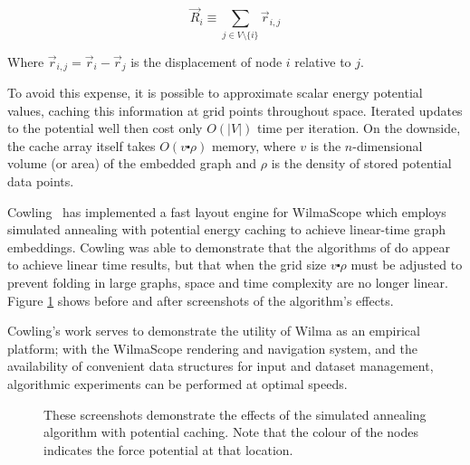 \documentclass[runningheads]{cl2emult}
\begin{document}
\begin{equation}
\label{repulsion}
\vec{R}_i \equiv \sum_{j \in V \setminus \{i\}} \vec{r}_{i,j}
\end{equation}

\noindent Where $\vec{r}_{i,j} = \vec{r}_i - \vec{r}_j$ is the displacement
of node $i$ relative to $j$.

To avoid this expense, it is possible to approximate scalar energy potential
values, caching this information at grid points throughout space.  Iterated
updates to the potential well then cost only $O(|V|)$ time per iteration.  On
the downside, the cache array itself takes $O(v \centerdot \rho)$ memory,
where $v$ is the $n$-dimensional volume (or area) of the embedded graph and
$\rho$ is the density of stored potential data points.

Cowling~\cite{cowling02fast} has implemented a fast layout engine for
WilmaScope which employs simulated annealing with potential energy caching to
achieve linear-time graph embeddings.  Cowling was able to demonstrate that
the algorithms of \cite{davidson01noise} do appear to achieve linear time
results, but that when the grid size $v \centerdot \rho$ must be adjusted to
prevent folding in large graphs, space and time complexity are no longer
linear.  Figure \ref{fig-fastlayout} shows before and after screenshots of
the algorithm's effects.

Cowling's work serves to demonstrate the utility of Wilma as an empirical
platform; with the WilmaScope rendering and navigation system, and the
availability of convenient data structures for input and dataset management,
algorithmic experiments can be performed at optimal speeds.

\begin{figure}[h]
  \centering
  \caption{These screenshots demonstrate the effects of the simulated
  annealing algorithm with potential caching.  Note that the colour of
  the nodes indicates the force potential at that location.}
  \label{fig-fastlayout}
\end{figure}
\end{document}
